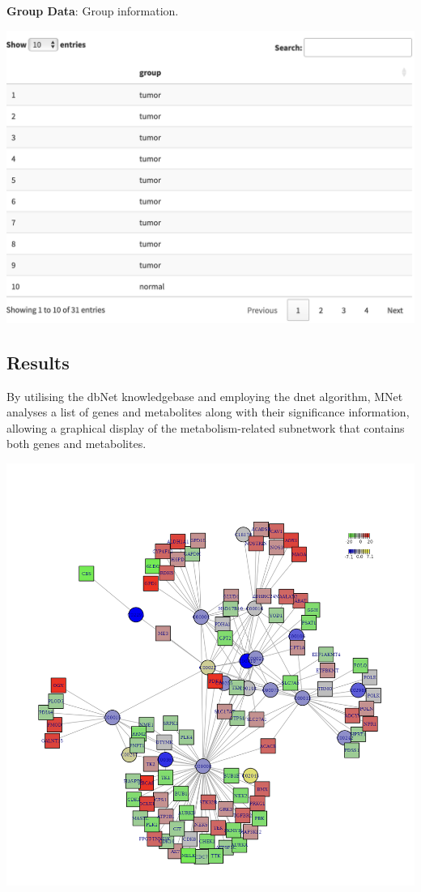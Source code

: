 \documentclass[
]{book}
\begin{document}
\textbf{Group Data}: Group information.

\begin{flushleft}\includegraphics[width=21.83in]{figure/GroupInfo} \end{flushleft}

\subsection{Results}\label{results}

By utilising the dbNet knowledgebase and employing the dnet algorithm, MNet analyses a list of genes and metabolites along with their significance information, allowing a graphical display of the metabolism-related subnetwork that contains both genes and metabolites.

\begin{center}\includegraphics[width=15.57in]{figure/subnetwork} \end{center}
\end{document}
